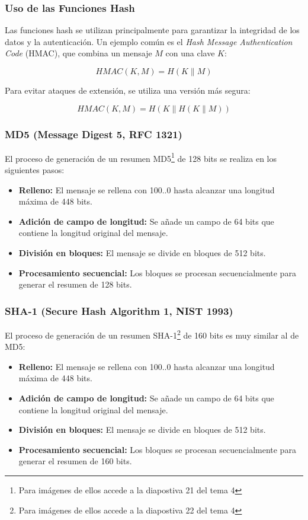 \documentclass[a4paper,12pt]{article}
\begin{document}
\subsubsection{Uso de las Funciones Hash}

Las funciones hash se utilizan principalmente para garantizar la integridad de los datos y la autenticación. Un ejemplo común es el \textit{Hash Message Authentication Code} (HMAC), que combina un mensaje \( M \) con una clave \( K \):

\[
HMAC(K, M) = H(K \parallel M)
\]

Para evitar ataques de extensión, se utiliza una versión más segura:

\[
HMAC(K, M) = H(K \parallel H(K \parallel M))
\]

\subsubsection{MD5 (Message Digest 5, RFC 1321)}

El proceso de generación de un resumen MD5\footnote{Para imágenes de ellos accede a la diapostiva 21 del tema 4} de 128 bits se realiza en los siguientes pasos:

\begin{itemize}
    \item \textbf{Relleno:} El mensaje se rellena con 100..0 hasta alcanzar una longitud máxima de 448 bits.
    \item \textbf{Adición de campo de longitud:} Se añade un campo de 64 bits que contiene la longitud original del mensaje.
    \item \textbf{División en bloques:} El mensaje se divide en bloques de 512 bits.
    \item \textbf{Procesamiento secuencial:} Los bloques se procesan secuencialmente para generar el resumen de 128 bits.
\end{itemize}

\subsubsection{SHA-1 (Secure Hash Algorithm 1, NIST 1993)}

El proceso de generación de un resumen SHA-1\footnote{Para imágenes de ellos accede a la diapostiva 22 del tema 4} de 160 bits es muy similar al de MD5:

\begin{itemize}
    \item \textbf{Relleno:} El mensaje se rellena con 100..0 hasta alcanzar una longitud máxima de 448 bits.
    \item \textbf{Adición de campo de longitud:} Se añade un campo de 64 bits que contiene la longitud original del mensaje.
    \item \textbf{División en bloques:} El mensaje se divide en bloques de 512 bits.
    \item \textbf{Procesamiento secuencial:} Los bloques se procesan secuencialmente para generar el resumen de 160 bits.
\end{itemize}
\end{document}
